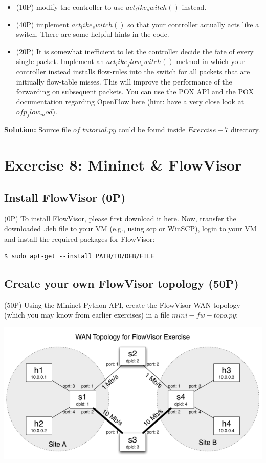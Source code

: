\documentclass{llncs}
\begin{document}
\begin{itemize}
\begin{itemize}
\item (10P) modify the controller to use $act_like_switch()$ instead.
\item (40P) implement $act_like_switch()$ so that your controller actually
acts like a switch. There are some helpful hints in the code.
\item (20P) It is somewhat inefficient to let the controller decide the fate 
of every single packet. Implement an $act_like_flow_switch()$ method in 
which  your controller instead installs flow-rules into the switch for all 
packets that are initiually flow-table misses. This will improve the 
performance of the forwarding on subsequent packets. You can use the POX API 
and the POX documentation regarding OpenFlow here (hint: have a very close 
look at $ofp_flow_mod$).
\end{itemize}
\textbf{Solution: } Source file $of\_tutorial.py$ could be found inside 
$Exercise-7$ directory.
\end{itemize}

%
\section{Exercise 8: Mininet \& FlowVisor}
\subsection{Install FlowVisor (0P)}
(0P) To install FlowVisor, please first download it here. Now, transfer the downloaded .deb file to your VM (e.g., using scp or WinSCP), login to your VM and install the required packages for FlowVisor:
\begin{lstlisting}
$ sudo apt-get --install PATH/TO/DEB/FILE
\end{lstlisting}

\subsection{Create your own FlowVisor topology (50P)}
(50P) Using the Mininet Python API, create the FlowVisor WAN topology (which 
you may know from earlier exercises) in a file $mini-fw-topo.py$:

\includegraphics[scale=0.55]{images/8-1.png} 
\end{document}
